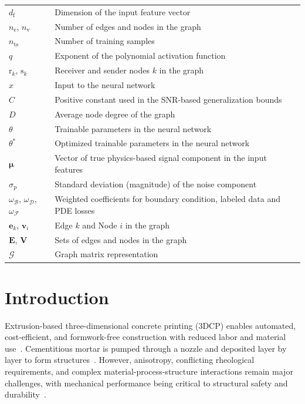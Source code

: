 \documentclass[review, authoryear, 12pt]{elsarticle}
\begin{document}
\begin{longtable}{@{}ll@{}}
    $d_{\text{f}}$ & Dimension of the input feature vector \\
    $n_{\text{e}}$, $n_{\text{v}}$ & Number of edges and nodes in the graph \\
    $n_{\text{ts}}$ & Number of training samples \\
    $q$ & Exponent of the polynomial activation function \\
    $\text{r}_k$, $\text{s}_k$ & Receiver and sender nodes $k$ in the graph \\
    $x$ & Input to the neural network \\
    $C$ & Positive constant used in the SNR-based generalization bounds \\
    $D$ & Average node degree of the graph \\
    $\theta$ & Trainable parameters in the neural network \\
    $\theta^*$ & Optimized trainable parameters in the neural network \\
    $\boldsymbol{\mu}$ & Vector of true physics-based signal component in the input features \\
    $\sigma_{\text{p}}$ & Standard deviation (magnitude) of the noise component \\
    $\omega_{\mathcal{B}}$, $\omega_{\mathcal{D}}$, $\omega_{\mathcal{F}}$ & Weighted coefficients for boundary condition, labeled data and PDE losses \\
    $\mathbf{e}_k$, $\mathbf{v}_i$ & Edge $k$ and Node $i$ in the graph \\
    $\mathbf{E}$, $\mathbf{V}$ & Sets of edges and nodes in the graph \\
    $\bm{\mathcal{G}}$ & Graph matrix representation \\

\end{longtable}

\addtocounter{table}{-1}

\section{Introduction}
\label{introduction}

Extrusion-based three-dimensional concrete printing (3DCP) enables automated, cost-efficient, and formwork-free construction with reduced labor and material use~\citep{de_schutter_vision_2018, weng_comparative_2020, alshboul_advancing_2025}. Cementitious mortar is pumped through a nozzle and deposited layer by layer to form structures~\citep{paolini_additive_2019}. However, anisotropy, conflicting rheological requirements, and complex material-process-structure interactions remain major challenges, with mechanical performance being critical to structural safety and durability~\citep{lu_systematical_2019, shehadeh_advanced_2025}.
\end{document}
